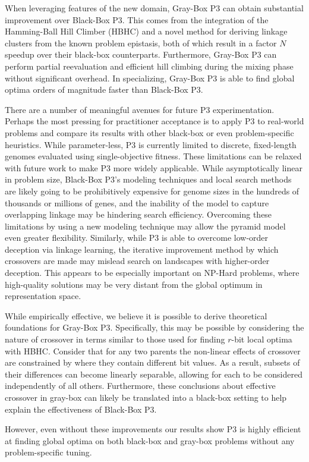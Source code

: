 When leveraging features of the new domain, Gray-Box P3 can obtain substantial improvement
over Black-Box P3. This comes from the integration of the Hamming-Ball Hill Climber (HBHC)
and a novel method for deriving linkage clusters from the known problem epistasis,
both of which result in a factor $N$ speedup over their black-box counterparts.
Furthermore, Gray-Box P3
can perform partial reevaluation and efficient hill climbing during the mixing phase
without significant overhead. In specializing, Gray-Box P3 is able to find
global optima orders of magnitude faster than Black-Box P3.

There are a number of meaningful avenues for future P3 experimentation. Perhaps the most
pressing for practitioner acceptance is to apply P3 to real-world problems and compare
its results with other black-box or even problem-specific heuristics. While parameter-less,
P3 is currently limited to discrete, fixed-length genomes evaluated using single-objective
fitness. These limitations can be relaxed with future work to make P3 more widely applicable.
While asymptotically linear in problem size, Black-Box P3's modeling techniques and local search methods are likely going
to be prohibitively expensive for genome sizes in the hundreds of thousands or millions of genes,
and the inability of the model to capture overlapping linkage may be hindering
search efficiency. Overcoming these limitations by using a new modeling technique may allow
the pyramid model even greater flexibility. Similarly, while P3 is able to overcome low-order
deception via linkage learning, the iterative improvement method by which crossovers
are made may mislead search on landscapes with higher-order deception. This appears
to be especially important on NP-Hard problems, where high-quality solutions may be
very distant from the global optimum in representation space.

While empirically effective, we believe it is possible to derive theoretical foundations
for Gray-Box P3. Specifically, this may be possible by considering the nature of crossover
in terms similar to those used for finding $r$-bit local optima with HBHC. Consider
that for any two parents the non-linear effects of crossover are constrained by
where they contain different bit values. As a result, subsets of their differences
can become linearly separable, allowing for each to be considered independently of all others.
Furthermore, these conclusions about effective crossover in gray-box can likely be translated
into a black-box setting to help explain the effectiveness of Black-Box P3.

However, even without
these improvements our results show P3 is highly efficient at finding
global optima on both black-box and gray-box problems without any problem-specific tuning.
